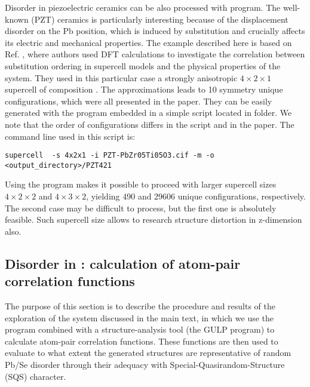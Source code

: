 \documentclass[a4paper,10pt]{article}
\begin{document}
Disorder in piezoelectric ceramics can be also processed with \sups{} program. The well-known  (PZT) ceramics is particularly interesting because of the displacement disorder on the Pb position, which is induced by  substitution and crucially affects its electric and mechanical properties. The example described here is based on Ref. \cite{Grinberg2004}, where authors used DFT calculations to investigate the correlation between substitution ordering in supercell models and the physical properties of the system. They used in this particular case a strongly anisotropic $4\times2\times1$ supercell of composition . The approximations leads to 10 symmetry unique configurations, which were all presented in the paper. They can be easily generated with the \sups{} program embedded in a simple script  located in  folder. We note that the order of configurations differs in the script and in the paper. The command line used in this script is:
\begin{Verbatim}[breaklines]
  supercell  -s 4x2x1 -i PZT-PbZr05Ti05O3.cif -m -o <output_directory>/PZT421
\end{Verbatim}
Using the \sups{} program makes it possible to proceed with larger supercell sizes $4\times2\times2$ and $4\times3\times2$, yielding 490 and 29606 unique configurations, respectively. The second case may be difficult to process, but the first one is absolutely feasible. Such supercell size allows to research structure distortion in z-dimension also.

\subsection*{Disorder in : calculation of atom-pair correlation functions}
The purpose of this section is to describe the procedure and results of the exploration of the  system discussed in the main text, in which we use the \sups{} program combined with a structure-analysis tool (the GULP program) to calculate atom-pair correlation functions. These functions are then used to evaluate to what extent the generated structures are representative of random Pb/Se disorder through their adequacy with Special-Quasirandom-Structure (SQS) character\cite{Zunger1990}.
\end{document}

